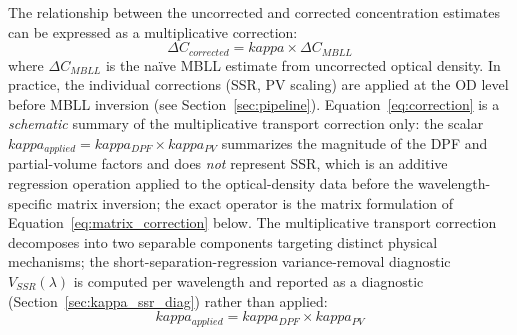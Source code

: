 \documentclass[11pt]{article}
\def\kappa{kappa}%
\def\mathrm#1{#1}%
\begin{document}
The relationship between the uncorrected and corrected concentration estimates can be expressed as a multiplicative correction:
\begin{equation}
\Delta C_{\mathrm{corrected}} = \kappa \times \Delta C_{\mathrm{MBLL}}
\label{eq:correction}
\end{equation}
where $\Delta C_{\mathrm{MBLL}}$ is the na\"ive MBLL estimate from uncorrected optical density. In practice, the individual corrections (SSR, PV scaling) are applied at the OD level before MBLL inversion (see Section~\ref{sec:pipeline}). Equation~\eqref{eq:correction} is a \emph{schematic} summary of the multiplicative transport correction only: the scalar $\kappa_{\mathrm{applied}}=\kappa_{\mathrm{DPF}}\times\kappa_{\mathrm{PV}}$ summarizes the magnitude of the DPF and partial-volume factors and does \emph{not} represent SSR, which is an additive regression operation applied to the optical-density data before the wavelength-specific matrix inversion; the exact operator is the matrix formulation of Equation~\eqref{eq:matrix_correction} below. The multiplicative transport correction decomposes into two separable components targeting distinct physical mechanisms; the short-separation-regression variance-removal diagnostic $V_{\mathrm{SSR}}(\lambda)$ is computed per wavelength and reported as a diagnostic (Section~\ref{sec:kappa_ssr_diag}) rather than applied:
\begin{equation}
\kappa_{\mathrm{applied}} = \kappa_{\mathrm{DPF}} \times \kappa_{\mathrm{PV}}
\label{eq:kappa}
\end{equation}
\end{document}
